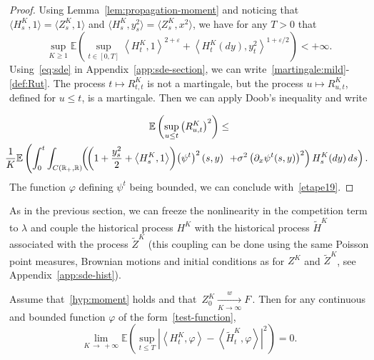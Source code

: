\documentclass[AHL,Unicode,longabstracts,published]{cedram}
\newcommand*\R{\mathbb{R}}
\newcommand*\E{\mathbb{E}}
\begin{document}
\begin{proof}
Using Lemma~\ref{lem:propagation-moment} and noticing that $\langle H^K_s,1\rangle =\langle Z^K_s,1\rangle$ and $\langle H^K_s,y_s^2\rangle =\langle Z^K_s,x^2\rangle$, we have for any $T>0$ that
\begin{equation}\label{etape19}
\sup_{K \geq 1} \E\left(\sup_{t \in [0, T]} \left\langle H^{K}_{t},1\right\rangle^{2+\varepsilon}+\left\langle H^K_t(dy),y_t^2\right\rangle^{1+\varepsilon/2} \right)<+\infty.
\end{equation}
Using~\eqref{eq:sde} in Appendix~\ref{app:sde-section}, we can write~\eqref{martingale:mild}-\eqref{def:Rut}. The process $t\mapsto R^K_{t, t}$ is not a martingale, but the process $u\mapsto R^K_{u, t}$, defined for $u\le t$, is a martingale. Then we can apply Doob's inequality and write

\vspace{-8pt}
\begin{multline*}
\E\left(\sup_{u \le t}\left(R_{u, t}^{K}\right)^2\right)\le
\\
\mkern-10mu \frac{1}{K}\E\left( \int_0^t \int_{C\left(\R_+,\R\right)}\! \!\left(\!\left(1 + \frac{y_s^2}{2} + \left\langle H^K_s,1\right\rangle\right)\!\left(\psi^t\right)^2(s,y)\right.\right.
\left.\left. + \sigma^2 \left(\partial_x \psi^t(s,y)\right)^2\right)H^K_s(dy)\, ds\right).
\end{multline*}
The function $\varphi$ defining $\psi^t$ being bounded, we can conclude with~\eqref{etape19}.
\end{proof}



As in the previous section, we can freeze the nonlinearity in the competition term to $\lambda$ and couple the historical process $H^K$ with the historical process $\widetilde{H}^K$ associated with the process $\widetilde{Z}^K$ (this coupling can be done using the same Poisson point measures, Brownian motions and initial conditions as for $Z^K$ and $\widetilde{Z}^K$, see Appendix~\ref{app:sde-hist}).


\begin{prop}\label{prop:coupligHHtilde}
Assume that~\eqref{hyp:moment} holds and that $\,{Z}^{K}_{0}\xrightarrow[K\to\infty]{w} F\,$. Then for any continuous and bounded function $\varphi$ of the form~\eqref{test-function},
\[
\lim_{K\,\to\,+\infty}\E\left(\sup_{t \le T} \left|\left\langle H^{K}_{t},\varphi\right\rangle-\left\langle\widetilde{H}^{K}_{t},\varphi\right\rangle\right|^2\right) = 0.
\]
\end{prop}
\end{document}
